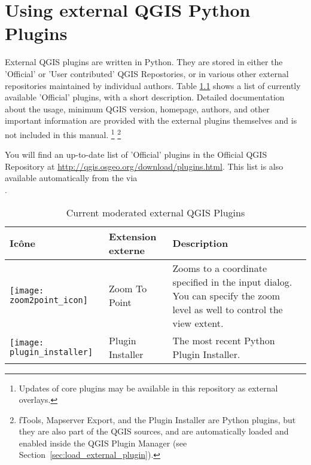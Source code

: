 
\chapter{Using external QGIS Python Plugins}\label{sec:external_plugins}


External QGIS plugins are written in Python. They are stored in either 
the 'Official' or 'User contributed' QGIS Repostories, or in various other external 
repositories maintained by individual authors. 
Table \ref{tab:external_plugins} shows a list of currently available 'Official' 
plugins, with a short description.
Detailed documentation about the usage, minimum QGIS version, homepage, authors, 
and other important information are provided with the external plugins themselves 
and is not included in this manual.
\footnote{Updates of core plugins may be 
available in this repository as external overlays.} 
\footnote{fTools, Mapserver Export, and the Plugin Installer are Python plugins, 
but they are also part of the QGIS sources, and are automatically loaded and 
enabled inside the QGIS Plugin Manager (see Section~\ref{sec:load_external_plugin}).}

You will find an up-to-date list of 'Official' plugins in the Official QGIS 
Repository at \url{http://qgis.osgeo.org/download/plugins.html}. This list is 
also available automatically from the  
via \\ 
.

\begin{table}[H]
\centering
 \begin{tabular}{|l|l|p{8cm}|}
\hline \textbf{Icône} & \textbf{Extension externe} & \textbf{Description}\\
\hline
\texttt{[image: zoom2point\_icon]}
 & Zoom To Point \index{plugins!Zoom To Point} & Zooms to a coordinate 
  specified in the input dialog. You can specify the zoom level as well to 
  control the view extent.\\
\hline
\texttt{[image: plugin\_installer]}
 & Plugin Installer \index{plugins!Plugin Installer} & The most recent Python Plugin Installer.\\
\hline
\end{tabular}
\caption{Current moderated external QGIS Plugins}\label{tab:external_plugins}
\end{table}

